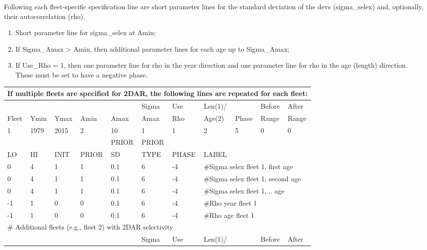 Following each fleet-specific specification line are short parameter lines for the standard deviation of the devs (sigma\_selex) and, optionally, their autocorrelation (rho).

\begin{enumerate}
	\item Short parameter line for sigma\_selex at Amin;
	\item If Sigma\_Amax > Amin, then additional parameter lines for each age up to Sigma\_Amax;
	\item If Use\_Rho = 1, then one parameter line for rho in the year direction and one parameter line for rho in the age (length) direction. These must be set to have a negative phase.
\end{enumerate}

\begin{longtable}{p{1cm} p{1cm} p{1cm} p{1.25cm} p{1.25cm} p{1.25cm} p{1.2cm} p{1.2cm} p{1cm} p{1cm} p{1cm}}
	\multicolumn{11}{l}{If multiple fleets are specified for 2DAR, the following lines are repeated for each fleet:} \\
	\hline
	\Tstrut &    &      &      &      & Sigma & Use & Len(1)/ &       & Before & After \\
	Fleet & Ymin & Ymax & Amin & Amax & Amax  & Rho & Age(2)  & Phase & Range  & Range \Bstrut\\
	\hline
	   1    & 1979 & 2015 &  2   &  10  & 1     & 1   & 2       & 5     & 0   & 0 \Tstrut\\
	\hline
	     &    &      &     & PRIOR & PRIOR &       &     & & & \Tstrut\\
	LO & HI & INIT & PRIOR & SD    & TYPE  & PHASE & \multicolumn{4}{l}{LABEL} \Bstrut\\
	\hline
	 0 & 4 & 1 & 1 & 0.1 & 6 & -4 & \multicolumn{4}{l}{\#Sigma selex fleet 1, first age} \Tstrut\\
	 0 & 4 & 1 & 1 & 0.1 & 6 & -4 & \multicolumn{4}{l}{\#Sigma selex fleet 1, second age} \Tstrut\\
	 0 & 4 & 1 & 1 & 0.1 & 6 & -4 & \multicolumn{4}{l}{\#Sigma selex fleet 1,... age} \Tstrut\\
	-1 & 1 & 0 & 0 & 0.1 & 6 & -4 & \multicolumn{4}{l}{\#Rho year fleet 1} \\
	-1 & 1 & 0 & 0 & 0.1 & 6 & -4 & \multicolumn{4}{l}{\#Rho age fleet 1} \\
	\hline
	\multicolumn{11}{l}{\# Additional fleets (e.g., fleet 2) with 2DAR selectivity} \\
	\Tstrut &    &      &      &      & Sigma & Use & Len(1)/ &       & Before & After \\

\end{longtable}

